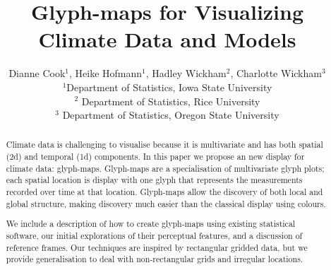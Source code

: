 \documentclass[oneside]{article}
\begin{document}
\title{Glyph-maps for Visualizing Climate Data and Models}
\author{Dianne Cook$^1$, Heike Hofmann$^1$, Hadley Wickham$^2$, Charlotte Wickham$^3$\\
$^1$Department of Statistics, Iowa State University\\
$^2$ Department of Statistics, Rice University\\
$^3$ Department of Statistics, Oregon State University}
\date{}



%
%
\maketitle

\begin{abstract}

Climate data is challenging to visualise because it is multivariate and has both spatial (2d) and temporal (1d) components. In this paper we propose an new display for climate data: glyph-maps. Glyph-maps are a specialisation of multivariate glyph plots; each spatial location is display with one glyph that represents the measurements recorded over time at that location. Glyph-maps allow the discovery of both local and global structure, making discovery much easier than the classical display using colours.

We include a description of how to create glyph-maps using existing statistical software, our initial explorations of their perceptual features, and a discussion of reference frames. Our techniques are inspired by rectangular gridded data, but we provide generalisation to deal with non-rectangular grids and irregular locations.

\end{abstract}
\end{document}
